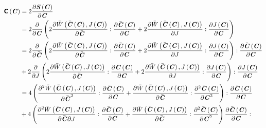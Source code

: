 \begin{equation}
  \begin{split}
    \fnof{\tensorfour{C}}{\tensor{C}}&=2\delby{\fnof{\tensortwo{S}}{\tensortwo{C}}}{\tensortwo{C}}\\
    &=2\delby{}{\tensortwo{C}}\pbrac{2\doubledotprod{\delby{\fnof{\bar{W}}{\fnof{\bar{\tensortwo{C}}}{\tensortwo{C}},\fnof{J}{\tensortwo{C}}}}{\bar{\tensortwo{C}}}}{\delby{\fnof{\bar{\tensortwo{C}}}{\tensortwo{C}}}{\tensortwo{C}}}+2\doubledotprod{\delby{\fnof{\bar{W}}{\fnof{\bar{\tensortwo{C}}}{\tensortwo{C}},\fnof{J}{\tensortwo{C}}}}{J}}{\delby{\fnof{J}{\tensortwo{C}}}{\tensortwo{C}}}}\\
    &=2\doubledotprod{\delby{}{\bar{\tensortwo{C}}}\pbrac{2\doubledotprod{\delby{\fnof{\bar{W}}{\fnof{\bar{\tensortwo{C}}}{\tensortwo{C}},\fnof{J}{\tensortwo{C}}}}{\bar{\tensortwo{C}}}}{\delby{\fnof{\bar{\tensortwo{C}}}{\tensortwo{C}}}{\tensortwo{C}}}+2\doubledotprod{\delby{\fnof{\bar{W}}{\fnof{\bar{\tensortwo{C}}}{\tensortwo{C}},\fnof{J}{\tensortwo{C}}}}{J}}{\delby{\fnof{J}{\tensortwo{C}}}{\tensortwo{C}}}}}{\delby{\fnof{\bar{\tensortwo{C}}}{\tensortwo{C}}}{\tensortwo{C}}}\\
    &+2\doubledotprod{\delby{}{J}\pbrac{2\doubledotprod{\delby{\fnof{\bar{W}}{\fnof{\bar{\tensortwo{C}}}{\tensortwo{C}},\fnof{J}{\tensortwo{C}}}}{\bar{\tensortwo{C}}}}{\delby{\fnof{\bar{\tensortwo{C}}}{\tensortwo{C}}}{\tensortwo{C}}}+2\doubledotprod{\delby{\fnof{\bar{W}}{\fnof{\bar{\tensortwo{C}}}{\tensortwo{C}},\fnof{J}{\tensortwo{C}}}}{J}}{\delby{\fnof{J}{\tensortwo{C}}}{\tensortwo{C}}}}}{\delby{\fnof{J}{\tensortwo{C}}}{\tensortwo{C}}}\\
    &=4\doubledotprod{\pbrac{\doubledotprod{\deltwosqby{\fnof{\bar{W}}{\fnof{\bar{\tensortwo{C}}}{\tensortwo{C}},\fnof{J}{\tensortwo{C}}}}{\bar{\tensortwo{C}}}}{\delby{\fnof{\bar{\tensortwo{C}}}{\tensortwo{C}}}{\tensortwo{C}}}
        +\doubledotprod{\delby{\fnof{\bar{W}}{\fnof{\bar{\tensortwo{C}}}{\tensortwo{C}},\fnof{J}{\tensortwo{C}}}}{\bar{\tensortwo{C}}}}{\deltwosqby{\fnof{\bar{\tensortwo{C}}}{\tensortwo{C}}}{\tensortwo{C}}}
     }}{\delby{\fnof{\bar{\tensortwo{C}}}{\tensortwo{C}}}{\tensortwo{C}}}\\
    &+4\doubledotprod{
      \pbrac{
        \doubledotprod{
          \deltwoby{
            \fnof{\bar{W}}{\fnof{\bar{\tensortwo{C}}}{\tensortwo{C}},\fnof{J}{\tensortwo{C}}}
          }{
            \bar{\tensortwo{C}}
          }{
            J
          }
        }{
          \delby{
            \fnof{\bar{\tensortwo{C}}}{\tensortwo{C}}
          }{
            \tensortwo{C}
          }
        }
        +\doubledotprod{
          \delby{
            \fnof{\bar{W}}{\fnof{\bar{\tensortwo{C}}}{\tensortwo{C}},\fnof{J}{\tensortwo{C}}}
          }{
            \bar{\tensortwo{C}}
          }
        }{
          \deltwosqby{\fnof{\bar{\tensortwo{C}}}{\tensortwo{C}}}{\tensortwo{C}}
        }
      }
            {
              \delby{\fnof{\bar{\tensortwo{C}}}{\tensortwo{C}}}{\tensortwo{C}}
            }
    }
  \end{split}
\end{equation}

